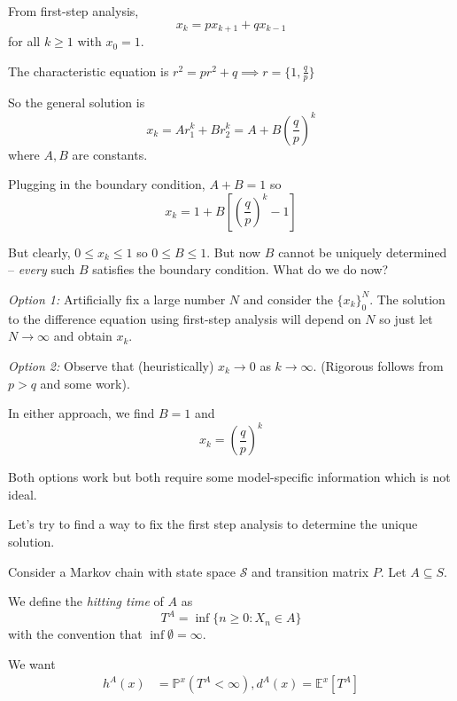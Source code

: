 \documentclass[12pt]{report}
\renewcommand{\P}{\mathbb{P}}
\newcommand{\E}{\mathbb{E}}
\renewcommand{\S}{\mathcal{S}}
\newcommand{\sub}{\subseteq}
\begin{document}
    From first-step analysis, 
    \[x_k = px_{k+1} + qx_{k-1}\]
    for all $k \geq 1$ with $x_0 = 1$. 

    The characteristic equation is $r^2 = pr^2 + q \implies r = \{1, \frac{q}{p}\}$ 

    So the general solution is 
    \[x_k = Ar_1^k + Br_2^k = A + B \left(\frac{q}{p}\right)^k\]
    where $A, B$ are constants. 

    Plugging in the boundary condition, $A + B = 1$ so 
    \[x_k = 1 + B\left[\left(\frac{q}{p}\right)^k - 1\right]\] 

    But clearly, $0 \leq x_k \leq 1$ so $0 \leq B \leq 1$. But now $B$ cannot be uniquely determined -- \emph{every} such $B$ satisfies the boundary condition. What do we do now? 

    \emph{Option 1:} Artificially fix a large number $N$ and consider the $\{x_k\}_0^N$. The solution to the difference equation using first-step analysis will depend on $N$ so just let $N \to \infty$ and obtain $x_k$.

    \emph{Option 2:} Observe that (heuristically) $x_k \to 0$ as $k \to \infty$. (Rigorous follows from $p > q$ and some work).

    In either approach, we find $B = 1$ and 
    \[x_k = \left(\frac{q}{p}\right)^k\] 

    Both options work but both require some model-specific information which is not ideal. 

    Let's try to find a way to fix the first step analysis to determine the unique solution. 

    Consider a Markov chain with state space $\S$ and transition matrix $P$. Let $A \sub S$. 

    We define the \emph{hitting time} of $A$ as 
    \[T^A = \inf\{n \geq 0: X_n \in A\}\]
    with the convention that $\inf \emptyset = \infty$. 

    We want 
    \begin{align*}
        h^A(x) &= \P^x(T^A < \infty), 
        d^A(x) = \E^x[T^A]
    \end{align*}
\end{document}
